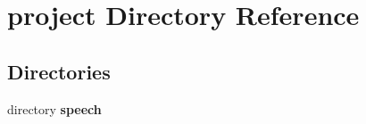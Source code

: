 \section{project Directory Reference}
\label{dir_47293fc27cd9ec57aa166a17f0c2ff59}
\subsection*{Directories}
\begin{DoxyCompactItemize}
\item 
directory {\bf speech}
\end{DoxyCompactItemize}
